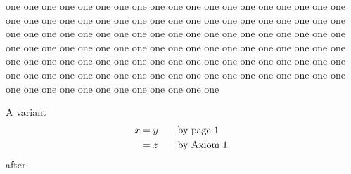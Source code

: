 \documentclass{article}
\begin{document}
one one one one one one one one one one one one one one one one one one
one one one one one one one one one one one one one one one one one one
one one one one one one one one one one one one one one one one one one
one one one one one one one one one one one one one one one one one one
one one one one one one one one one one one one one one one one one one
one one one one one one one one one one one one one one one one one one
one one one one one one one one one one one one one one one one one one

A variant
\begin{alignat}{2}
x& = y &\quad& \text{by \typeout{D=\thepage}page \thepage}\\
 & = z && \text {by Axiom 1.}
\end{alignat}
after 
\end{document}
